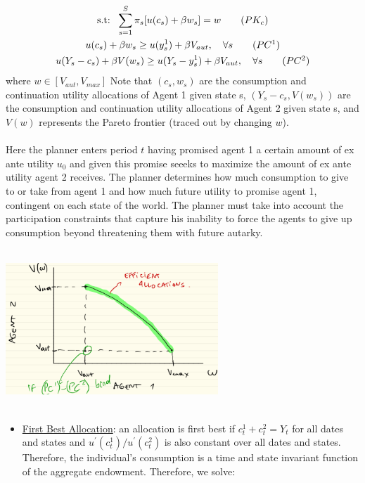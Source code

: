 \documentclass{article}
\begin{document}
\begin{itemize}
\begin{gather*}
        \text{s.t:} \ \ \sum_{s=1}^{S} \pi_{s} [u(c_{s}) + \beta w_{s}] = w \tag{$PK_{c}$}\\
        u(c_{s}) + \beta w_{s} \geq u(y_{s}^{1}) + \beta V_{aut}, \ \ \ \forall s \tag{$PC^{1}$} \\
        u(Y_{s} - c_{s}) + \beta V(w_{s}) \geq u(Y_{s} - y_{s}^{1}) + \beta V_{aut}, \ \ \ \forall s \tag{$PC^{2}$}
    \end{gather*}
    where $w \in [V_{aut}, V_{max}]$
    Note that $(c_{s}, w_{s})$ are the consumption and continuation utility allocations of Agent 1 given state s, $(Y_{s} - c_{s}, V(w_{s}))$ are the consumption and continuation utility allocations of Agent 2 given state s, and $V(w)$ represents the Pareto frontier (traced out by changing $w$). \\ \\
    Here the planner enters period $t$ having promised agent 1 a certain amount of ex ante utility $u_{0}$ and given this promise seeeks to maximize the amount of ex ante utility agent 2 receives. The planner determines how much consumption to give to or take from agent 1 and how much future utility to promise agent 1, contingent on each state of the world. The planner must take into account the participation constraints that capture his inability to force the agents to give up consumption beyond threatening them with future autarky.
    \newline
    \begin{center}
    \includegraphics[width=8cm, height=6cm]{pic16}
    \end{center}
    \begin{itemize}
        \item  \underline{First Best Allocation}: an allocation is first best if $c_{t}^{1} + c_{t}^{2} = Y_{t}$ for all dates and states and $u^{'}(c_{t}^{1})/u^{'}(c_{t}^{2})$ is also constant over all dates and states. Therefore, the individual's consumption is a time and state invariant function of the aggregate endowment. Therefore, we solve:

\end{itemize}
\end{itemize}
\end{document}
